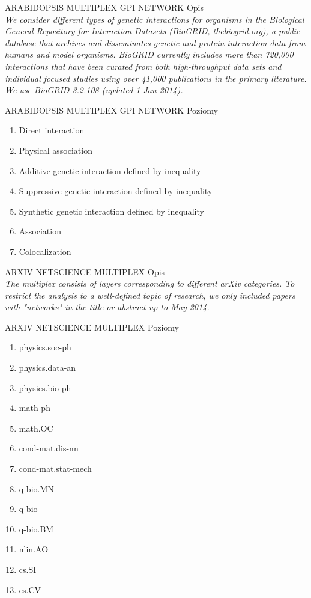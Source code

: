 \documentclass{beamer}
\begin{document}
\begin{frame}{ARABIDOPSIS MULTIPLEX GPI
NETWORK}
Opis \\
\vspace{5mm}
\textit{We consider different types of genetic interactions for organisms in the Biological General
Repository for Interaction Datasets (BioGRID, thebiogrid.org), a public database that
archives and disseminates genetic and protein interaction data from humans and model
organisms. BioGRID currently includes more than 720,000 interactions that have been
curated from both high-throughput data sets and individual focused studies using over
41,000 publications in the primary literature. We use BioGRID 3.2.108 (updated 1 Jan 2014).}
\end{frame}
\begin{frame}{ARABIDOPSIS MULTIPLEX GPI
NETWORK}
Poziomy 
\begin{enumerate}
\item Direct interaction
\item Physical association
\item Additive genetic interaction defined by inequality
\item Suppressive genetic interaction defined by inequality
\item Synthetic genetic interaction defined by inequality
\item Association
\item Colocalization
\end{enumerate}
\end{frame}

\begin{frame}{ARXIV NETSCIENCE MULTIPLEX}
Opis\\
\vspace{5mm}
\textit{The multiplex consists of layers corresponding to different arXiv categories. To restrict the
analysis to a well-defined topic of research, we only included papers with "networks" in the
title or abstract up to May 2014.}
\end{frame}
\begin{frame}{ARXIV NETSCIENCE MULTIPLEX}
Poziomy
\begin{enumerate}
\item physics.soc-ph
\item physics.data-an
\item physics.bio-ph
\item math-ph
\item math.OC
\item cond-mat.dis-nn
\item cond-mat.stat-mech
\item q-bio.MN
\item q-bio
\item q-bio.BM
\item nlin.AO
\item cs.SI
\item cs.CV
\end{enumerate}
\end{frame}
\end{document}
